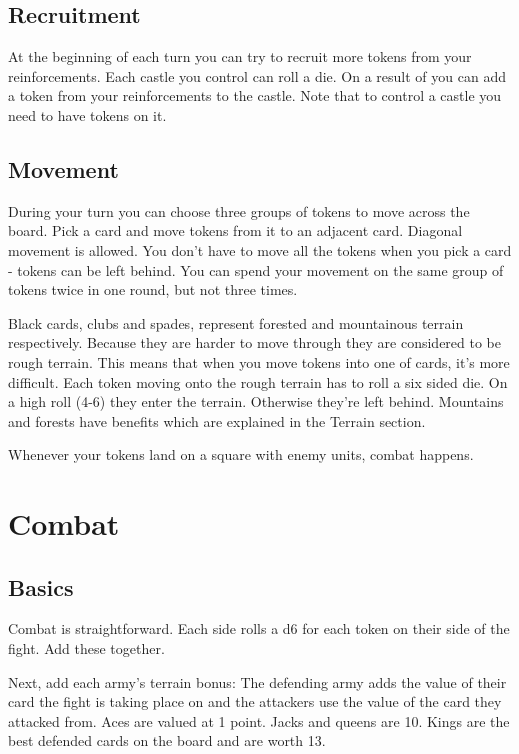 \documentclass{article}
\begin{document}
\subsection{Recruitment}

At the beginning of each turn you can try to recruit more tokens from your reinforcements.  Each castle you control can roll a die.  On a result of \recruitroll you can add a token from your reinforcements to the castle.   Note that to control a castle you need to have tokens on it.

\subsection{Movement}

During your turn you can choose three groups of tokens to move across the board.  Pick a card and move tokens from it to an adjacent card.  Diagonal movement is allowed.  You don't have to move all the tokens when you pick a card - tokens can be left behind.  You can spend your movement on the same group of tokens twice in one round, but not three times.  

Black cards, clubs and spades, represent forested and mountainous terrain respectively.  Because they are harder to move through they are considered to be rough terrain.  This means that when you move tokens into one of cards, it's more difficult.  Each token moving onto the rough terrain has to roll a six sided die.  On a high roll (4-6) they enter the terrain.  Otherwise they're left behind.  Mountains and forests have benefits which are explained in the Terrain section. 

Whenever your tokens land on a square with enemy units, combat happens.

\section{Combat}

\subsection{Basics}

Combat is straightforward.  Each side rolls a d6 for each token on their side of the fight.  Add these together.

Next, add each army's terrain bonus:  The defending army adds the value of their card the fight is taking place on and the attackers use the value of the card they attacked from.  Aces are valued at 1 point.  Jacks and queens are 10.  Kings are the best defended cards on the board and are worth 13.
\end{document}
